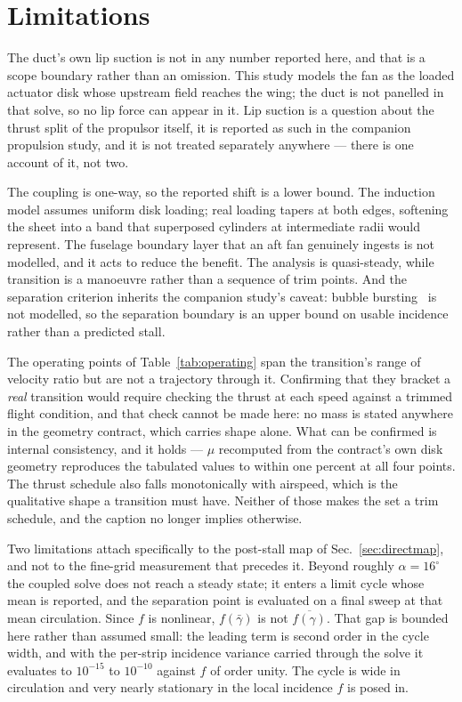 \documentclass[submit]{aiaa-tc}%
\begin{document}
\section{Limitations}
\label{sec:limits}

The duct's own lip suction is not in any number reported here, and that is
a scope boundary rather than an omission. This study models the fan as the
loaded actuator disk whose upstream field reaches the wing; the duct is not
panelled in that solve, so no lip force can appear in it. Lip suction is a
question about the thrust split of the propulsor itself, it is reported as
such in the companion propulsion study, and it is not treated separately
anywhere --- there is one account of it, not two.

The coupling is one-way, so the reported shift is a lower bound. The
induction model assumes uniform disk loading; real loading tapers at both
edges, softening the sheet into a band that superposed cylinders at
intermediate radii would represent. The fuselage boundary layer that an
aft fan genuinely ingests is not modelled, and it acts to reduce the
benefit. The analysis is quasi-steady, while transition is a manoeuvre
rather than a sequence of trim points. And the separation criterion
inherits the companion study's caveat: bubble bursting~\cite{gaster1967} is
not modelled, so
the separation boundary is an upper bound on usable incidence rather than
a predicted stall.

The operating points of Table~\ref{tab:operating} span the transition's
range of velocity ratio but are not a trajectory through it. Confirming
that they bracket a \emph{real} transition would require checking the
thrust at each speed against a trimmed flight condition, and that check
cannot be made here: no mass is stated anywhere in the geometry contract,
which carries shape alone. What can be confirmed is internal consistency,
and it holds --- $\mu$ recomputed from the contract's own disk geometry
reproduces the tabulated values to within one percent at all four points.
The thrust schedule also falls monotonically with airspeed, which is the
qualitative shape a transition must have. Neither of those makes the set a
trim schedule, and the caption no longer implies otherwise.

Two limitations attach specifically to the post-stall map of
Sec.~\ref{sec:directmap}, and not to the fine-grid measurement that
precedes it. Beyond roughly $\alpha = 16^\circ$ the coupled solve does not
reach a steady state; it enters a limit cycle whose mean is reported, and
the separation point is evaluated on a final sweep at that mean
circulation. Since $f$ is nonlinear, $f(\bar\gamma)$ is not
$\overline{f(\gamma)}$. That gap is bounded here rather than assumed small:
the leading term is second order in the cycle width, and with the per-strip
incidence variance carried through the solve it evaluates to $10^{-15}$ to
$10^{-10}$ against $f$ of order unity. The cycle is wide in circulation and
very nearly stationary in the local incidence $f$ is posed in.
\end{document}
